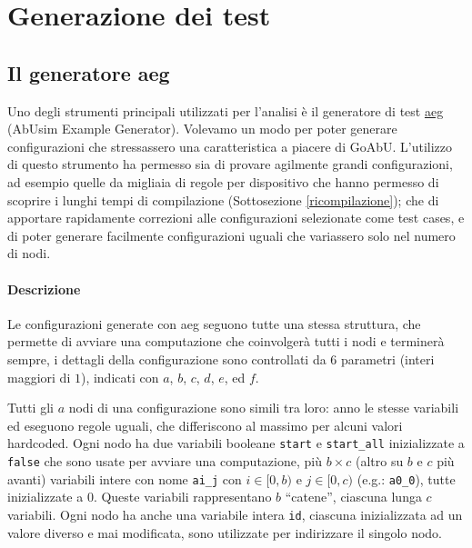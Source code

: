 \documentclass[12pt, a4paper]{article}
\begin{document}
\section{Generazione dei test}

\subsection{Il generatore aeg}

Uno degli strumenti principali utilizzati per l'analisi è il generatore di test \href{https://github.com/KayJay7/abusim-example-generator}{aeg} (AbUsim Example Generator). Volevamo un modo per poter generare configurazioni che stressassero una caratteristica a piacere di GoAbU. L'utilizzo di questo strumento ha permesso sia di provare agilmente grandi configurazioni, ad esempio quelle da migliaia di regole per dispositivo che hanno permesso di scoprire i lunghi tempi di compilazione (Sottosezione \ref{ricompilazione}); che di apportare rapidamente correzioni alle configurazioni selezionate come test cases, e di poter generare facilmente configurazioni uguali che variassero solo nel numero di nodi.

\paragraph{Descrizione}\label{aeg:descrizione}

Le configurazioni generate con aeg seguono tutte una stessa struttura, che permette di avviare una computazione che coinvolgerà tutti i nodi e terminerà sempre, i dettagli della configurazione sono controllati da $6$ parametri (interi maggiori di $1$), indicati con $a$, $b$, $c$, $d$, $e$, ed $f$.

Tutti gli $a$ nodi di una configurazione sono simili tra loro: anno le stesse variabili ed eseguono regole uguali, che differiscono al massimo per alcuni valori hardcoded. Ogni nodo ha due variabili booleane \lstinline{start} e \lstinline{start_all} inizializzate a \lstinline{false} che sono usate per avviare una computazione, più $b\times c$ (altro su $b$ e $c$ più avanti) variabili intere con nome \lstinline{ai_j} con $i\in [0,b)$ e $j\in [0,c)$ (e.g.: \lstinline{a0_0}), tutte inizializzate a $0$. Queste variabili rappresentano $b$ ``catene'', ciascuna lunga $c$ variabili. Ogni nodo ha anche una variabile intera \lstinline{id}, ciascuna inizializzata ad un valore diverso e mai modificata, sono utilizzate per indirizzare il singolo nodo.
\end{document}
